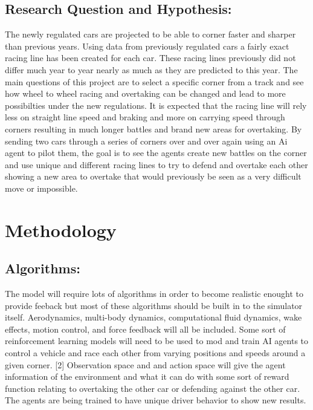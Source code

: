 \documentclass[11pt]{article} %
\begin{document}
\subsection {Research Question and Hypothesis:} The newly regulated cars are projected to be able to corner faster and sharper than previous years. Using data from previously regulated cars a fairly exact racing line has been created for each car. These racing lines previously did not differ much year to year nearly as much as they are predicted to this year. The main questions of this project are to select a specific corner from a track and see how wheel to wheel racing and overtaking can be changed and lead to more possibilties under the new regulations. It is expected that the racing line will rely less on straight line speed and braking and more on carrying speed through corners resulting in much longer battles and brand new areas for overtaking. By sending two cars through a series of corners over and over again using an Ai agent to pilot them, the goal is to see the agents create new battles on the corner and use unique and different racing lines to try to defend and overtake each other showing a new area to overtake that would previously be seen as a very difficult move or impossible.


\section{Methodology}

\subsection {Algorithms:} The model will require lots of algorithms in order to become realistic enought to provide feeback but most of these algorithms should be built in to the simulator itself. Aerodynamics, multi-body dynamics, computational fluid dynamics, wake effects, motion control, and force feedback will all be included. Some sort of reinforcement learning models will need to be used to mod and train AI agents to control a vehicle and race each other from varying positions and speeds around a given corner. [2] Observation space and and action space will give the agent information of the environment and what it can do with some sort of reward function relating to overtaking the other car or defending against the other car. The agents are being trained to have unique driver behavior to show new results.
\end{document}

